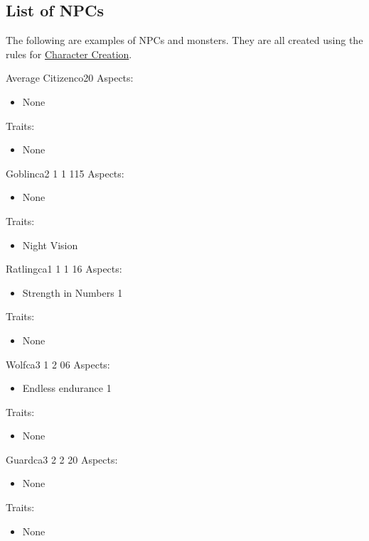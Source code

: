 \documentclass[11pt]{article}
\begin{document}
{\subsection{List of NPCs}
\label{sec:orgd6179c5}
The following are examples of NPCs and monsters. They are all created using the rules for \hyperref[sec:org4d9a5ae]{Character Creation}. 

\begin{npc}{Average Citizen}{co}{2}{0}
Aspects:
\begin{itemize}
\item None
\end{itemize}
Traits:
\begin{itemize}
\item None
\end{itemize}
\end{npc}

\begin{npc}{Goblin}{ca}{2 1 1 1}{15}
Aspects:
\begin{itemize}
\item None
\end{itemize}
Traits:
\begin{itemize}
\item Night Vision
\end{itemize}
\end{npc}

\begin{npc}{Ratling}{ca}{1 1 1 1}{6}
Aspects:
\begin{itemize}
\item Strength in Numbers 1
\end{itemize}
Traits:
\begin{itemize}
\item None
\end{itemize}
\end{npc}

\begin{npc}{Wolf}{ca}{3 1 2 0}{6}
Aspects:
\begin{itemize}
\item Endless endurance 1
\end{itemize}
Traits:
\begin{itemize}
\item None
\end{itemize}
\end{npc}

\begin{npc}{Guard}{ca}{3 2 2 2}{0}
Aspects:
\begin{itemize}
\item None
\end{itemize}
Traits:
\begin{itemize}
\item None
\end{itemize}
\end{npc}

}
\end{document}

